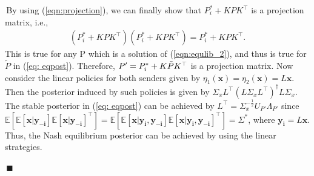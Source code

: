 \documentclass[12pt,journal,onecolumn]{IEEEtran}
\newenvironment{Proof}[1]{\medskip\par\noindent{\bf Proof:\,}\,#1}{{\mbox{\,$\blacksquare$}\par}}
\begin{document}
\begin{Proof}
By using (\ref{eqn:projection}), we can finally show that $P_i^*+KPK^\top$ is a projection matrix, i.e.,
\begin{align*}
    (P_i^*+KPK^\top)(P_i^*+KPK^\top)=P_i^*+KPK^\top.
\end{align*}
This is true for any P which is a solution of (\ref{eqn:equlib_2}), and thus is true for $\tilde{P}$ in (\ref{eq: eqpost}). Therefore, $P'=P_i^*+K\Tilde{P}K^\top$ is a projection matrix. Now consider the linear policies for both senders given by $\eta_1(\boldsymbol{x})=\eta_2(\boldsymbol{x})=L\boldsymbol{x}$. Then the posterior induced by such policies is given by $\Sigma_xL^\top(L\Sigma_xL^\top)^{\dagger}L\Sigma_x$. The stable posterior in (\ref{eq: eqpost}) can be achieved by $L^\top=\Sigma_x^{-\frac{1}{2}}U_{P'}\Lambda_{P'}$ since  $\mathbb{E}[\mathbb{E}[\boldsymbol{x}|\boldsymbol{y_{-i}}]\mathbb{E}[\boldsymbol{x}|\boldsymbol{y_{-i}}]^\top]=\mathbb{E}[\mathbb{E}[\boldsymbol{x}|\boldsymbol{y_i},\boldsymbol{y_{-i}}]\mathbb{E}[\boldsymbol{x}|\boldsymbol{y_i},\boldsymbol{y_{-i}}]^\top]=\Sigma^*$, where $\boldsymbol{y_i}=L\boldsymbol{x}$.
Thus, the Nash equilibrium posterior can be achieved by using the linear strategies.


\end{Proof}
\end{document}
